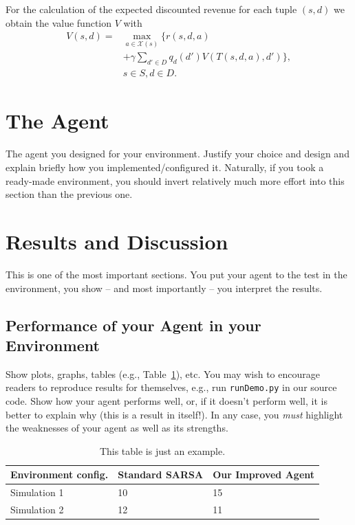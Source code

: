 \documentclass[journal, a4paper]{IEEEtran}
\begin{document}
For the calculation of the expected discounted revenue for each tuple $(s, d)$ we obtain the value function $V$ with\\
\begin{equation}
	\label{eq:ValueFunction}
	\begin{split}
		V(s,d) = &\max_{a \in \mathcal{X} (s)} \{ r(s, d, a)  \\
		&+ \gamma \sum_{d' \in D} q_d(d') V(T(s, d, a), d') \}, \\ 
		&s \in S, d \in D. 
	\end{split}
\end{equation}
\section{The Agent}

The agent you designed for your environment. Justify your choice and design and explain briefly how you implemented/configured it. Naturally, if you took a ready-made environment, you should invert relatively much more effort into this section than the previous one.

\section{Results and Discussion}

This is one of the most important sections. You put your agent to the test in the environment, you show -- and most importantly -- you interpret the results.

\subsection{Performance of your Agent in your Environment}

Show plots, graphs, tables (e.g., Table~\ref{a_table}), etc. You may wish to encourage readers to reproduce results for themselves, e.g., run \texttt{runDemo.py} in our source code. Show how your agent performs well, or, if it doesn't perform well, it is better to explain why (this is a result in itself!). In any case, you \emph{must} highlight the weaknesses of your agent as well as its strengths.

\begin{table}[h]
	\caption{\label{a_table}This table is just an example.}
	\centering
	\begin{tabular}{lll}
		\hline
		\textbf{Environment config.} & \textbf{Standard SARSA} & \textbf{Our Improved Agent}  \\
		\hline
		Simulation 1        & 10             & 15 \\
		Simulation 2        & 12             & 11 \\
		\hline
	\end{tabular}
\end{table}
\end{document}
